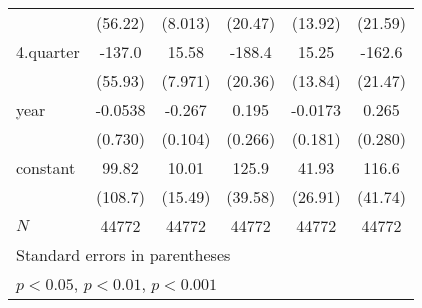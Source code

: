 \begin{table}[!h]
\begin{tabular}{l*{5}{c}}
            &     (56.22)         &     (8.013)         &     (20.47)         &     (13.92)         &     (21.59)         \\
4.quarter   &      -137.0\sym{*}  &       15.58         &      -188.4\sym{***}&       15.25         &      -162.6\sym{***}\\
            &     (55.93)         &     (7.971)         &     (20.36)         &     (13.84)         &     (21.47)         \\
year        &     -0.0538         &      -0.267\sym{*}  &       0.195         &     -0.0173         &       0.265         \\
            &     (0.730)         &     (0.104)         &     (0.266)         &     (0.181)         &     (0.280)         \\
constant    &       99.82         &       10.01         &       125.9\sym{**} &       41.93         &       116.6\sym{**} \\
            &     (108.7)         &     (15.49)         &     (39.58)         &     (26.91)         &     (41.74)         \\
\hline
\(N\)       &       44772         &       44772         &       44772         &       44772         &       44772         \\
\hline\hline
\multicolumn{6}{l}{\footnotesize Standard errors in parentheses}\\
\multicolumn{6}{l}{\footnotesize \sym{*} \(p<0.05\), \sym{**} \(p<0.01\), \sym{***} \(p<0.001\)}\\
\end{tabular}
\end{table}
